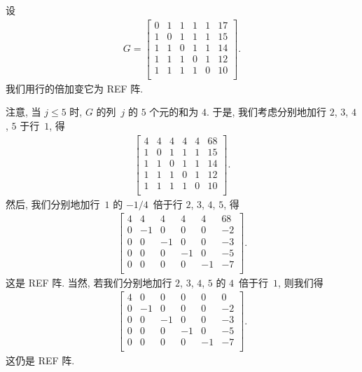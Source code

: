 \documentclass[../libro.tex]{subfiles}
\begin{document}
\begin{example}
    设
    \begin{align*}
        G =
        \begin{bmatrix}
            0 & 1 & 1 & 1 & 1 & 17 \\
            1 & 0 & 1 & 1 & 1 & 15 \\
            1 & 1 & 0 & 1 & 1 & 14 \\
            1 & 1 & 1 & 0 & 1 & 12 \\
            1 & 1 & 1 & 1 & 0 & 10 \\
        \end{bmatrix}.
    \end{align*}
    我们用行的倍加变它为 REF 阵.

    注意, 当 \(j \leq 5\) 时,
    \(G\) 的列~\(j\) 的 \(5\) 个元的和为 \(4\).
    于是, 我们考虑分别地加行
    \(2\), \(3\), \(4\), \(5\)
    于行~\(1\), 得
    \begin{align*}
        \begin{bmatrix}
            4 & 4 & 4 & 4 & 4 & 68 \\
            1 & 0 & 1 & 1 & 1 & 15 \\
            1 & 1 & 0 & 1 & 1 & 14 \\
            1 & 1 & 1 & 0 & 1 & 12 \\
            1 & 1 & 1 & 1 & 0 & 10 \\
        \end{bmatrix}.
    \end{align*}
    然后, 我们分别地加行~\(1\) 的 \(-1/4\)~倍于行
    \(2\), \(3\), \(4\), \(5\), 得
    \begin{align*}
        \begin{bmatrix}
            4 & 4  & 4  & 4  & 4  & 68 \\
            0 & -1 & 0  & 0  & 0  & -2 \\
            0 & 0  & -1 & 0  & 0  & -3 \\
            0 & 0  & 0  & -1 & 0  & -5 \\
            0 & 0  & 0  & 0  & -1 & -7 \\
        \end{bmatrix}.
    \end{align*}
    这是 REF 阵.
    当然, 若我们分别地加行
    \(2\), \(3\), \(4\), \(5\)
    的 \(4\)~倍于行~\(1\), 则我们得
    \begin{align*}
        \begin{bmatrix}
            4 & 0  & 0  & 0  & 0  & 0  \\
            0 & -1 & 0  & 0  & 0  & -2 \\
            0 & 0  & -1 & 0  & 0  & -3 \\
            0 & 0  & 0  & -1 & 0  & -5 \\
            0 & 0  & 0  & 0  & -1 & -7 \\
        \end{bmatrix}.
    \end{align*}
    这仍是 REF 阵.
\end{example}
\end{document}
